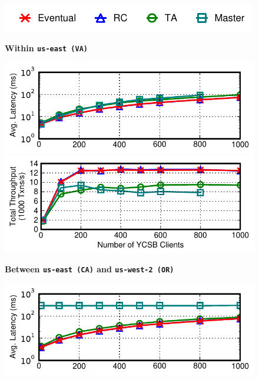 \begin{figure}[t!]
\begin{center}
\includegraphics[width=.8\columnwidth]{figs/strategylegend.pdf}
\end{center}\vspace{-2em}
\begin{center}\small\textbf{Within \texttt{us-east (VA)}}\end{center}\vspace{-1.5em}
\includegraphics[width=0.90\columnwidth]{figs/finals/2lan-threads-lats-log.pdf}\vspace{-.5em}
\includegraphics[width=0.90\columnwidth]{figs/finals/2lan-threads-thru.pdf}
\begin{center}\small\textbf{Between \texttt{us-east (CA)} and \texttt{us-west-2 (OR)}}\end{center}\vspace{-1.5em}
\includegraphics[width=0.90\columnwidth]{figs/finals/2wan-threads-lats-log.pdf}\vspace{-.5em}

\end{figure}
